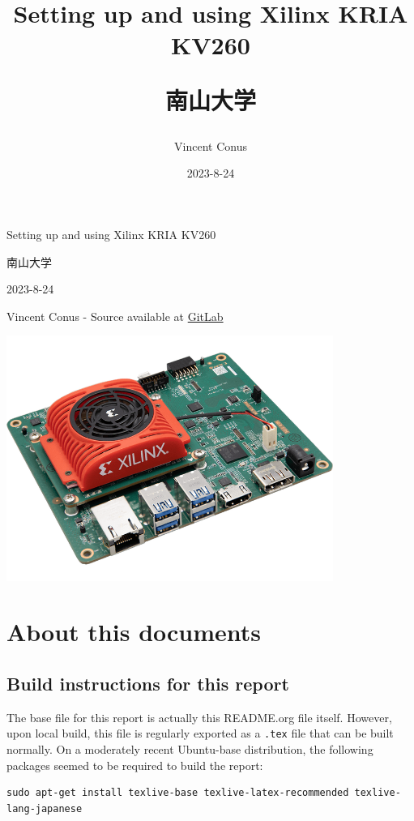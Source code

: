 \documentclass[10pt]{article}
\author{Vincent Conus}
\date{2023-8-24}
\title{Setting up and using Xilinx KRIA KV260\\\medskip
\large \begin{CJK}{UTF8}{min}南山大学\end{CJK}}
\newcommand{\gitlab}[1]{%
\href{#1}{GitLab \faGitlab}}
\begin{document}
\begin{titlepage}
\centering
{\LARGE Setting up and using Xilinx KRIA KV260 \par }
\vspace{5mm}
{\large \begin{CJK}{UTF8}{min}南山大学\end{CJK} \par}
\vspace{1cm}
{\large 2023-8-24 \par}
\vspace{2cm}
{\large Vincent Conus -  Source available at \gitlab{https://gitlab.com/sunoc/xilinx-kria-kv260-documentation} \par}
\vspace{3cm}
\includegraphics[width=0.8\textwidth]{./img/board}\end{titlepage}
\tableofcontents
\pagebreak
\section{About this documents}
\label{sec:org3952ce8}
\subsection{Build instructions for this report}
\label{sec:orge38070b}
The base file for this report is actually this README.org file itself.
However, upon local build, this file is regularly exported as
a \texttt{.tex} file that can be built normally.
On a moderately recent Ubuntu-base distribution, the following packages seemed to be required to build the
report:

\begin{verbatim}
sudo apt-get install texlive-base texlive-latex-recommended texlive-lang-japanese
\end{verbatim}
\end{document}
